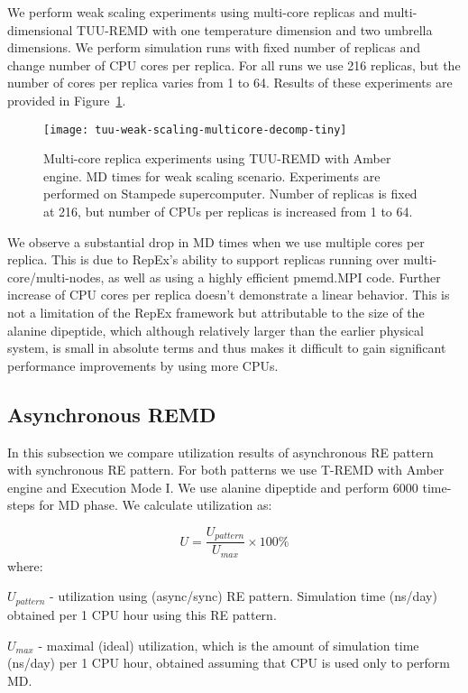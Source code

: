 \documentclass{sig-alternate-05-2015}
\begin{document}
We perform weak scaling experiments using multi-core replicas and multi-dimensional TUU-REMD with one temperature dimension and two umbrella dimensions. We perform simulation runs with fixed number of replicas and change number of CPU cores per replica. For all runs we use 216 replicas, but the number of cores per replica varies from 1 to 64. Results of these experiments are provided in Figure~\ref{fig:multicore_3d}. 

\begin{figure}[ht!]
\centering
\texttt{[image: tuu-weak-scaling-multicore-decomp-tiny]}
\caption{\small{Multi-core replica experiments using TUU-REMD with Amber engine. MD times for weak scaling scenario. Experiments are performed on Stampede supercomputer. Number of replicas is fixed at 216, but number of CPUs per replicas is increased from 1 to 64.}}
\label{fig:multicore_3d}
\end{figure}

We observe a substantial drop in MD times when we use multiple cores per replica. This is due to RepEx's ability to support replicas running over multi-core/multi-nodes, as well as using a highly efficient pmemd.MPI code. Further increase of CPU cores per replica doesn't demonstrate a linear behavior. This is not a limitation of the RepEx framework but attributable to the size of the alanine dipeptide, which although relatively larger than the earlier physical system, is small in absolute terms and thus makes it difficult to gain significant performance improvements by using more CPUs.

\subsection{Asynchronous REMD} \label{over}

In this subsection we compare utilization results of asynchronous RE pattern with synchronous RE pattern. For both patterns we use T-REMD with Amber engine and Execution Mode I. We use alanine dipeptide and perform 6000 time-steps for MD phase. We calculate utilization as:

\begin{equation} U = \frac{U_{pattern}}{U_{max}} \times 100 \% \end{equation} where:
\begin{compactitem}
  \item $U_{pattern}$ - utilization using (async/sync) RE pattern. Simulation time (ns/day) obtained per 1 CPU hour using this RE pattern. 
  \item $U_{max}$ - maximal (ideal) utilization, which is the amount of simulation time (ns/day) per 1 CPU hour, obtained assuming that CPU is used only to perform MD. 
\end{compactitem}
\end{document}
